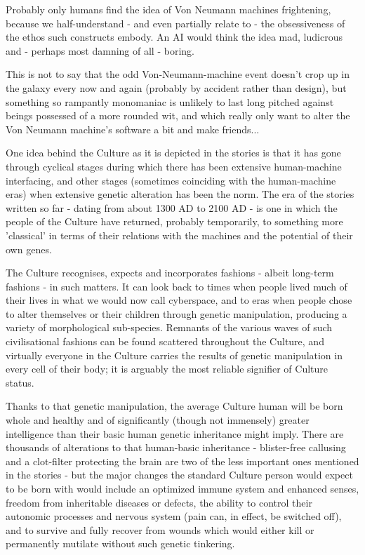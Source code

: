 Probably only humans find the idea of Von Neumann machines frightening, because we half-understand - and even partially relate to - the obsessiveness of the ethos such constructs embody. An AI would think the idea mad, ludicrous and - perhaps most damning of all - boring.

This is not to say that the odd Von-Neumann-machine event doesn't crop up in the galaxy every now and again (probably by accident rather than design), but something so rampantly monomaniac is unlikely to last long pitched against beings possessed of a more rounded wit, and which really only want to alter the Von Neumann machine's software a bit and make friends...

One idea behind the Culture as it is depicted in the stories is that it has gone through cyclical stages during which there has been extensive human-machine interfacing, and other stages (sometimes coinciding with the human-machine eras) when extensive genetic alteration has been the norm. The era of the stories written so far - dating from about 1300 AD to 2100 AD - is one in which the people of the Culture have returned, probably temporarily, to something more 'classical' in terms of their relations with the machines and the potential of their own genes.

The Culture recognises, expects and incorporates fashions - albeit long-term fashions - in such matters. It can look back to times when people lived much of their lives in what we would now call cyberspace, and to eras when people chose to alter themselves or their children through genetic manipulation, producing a variety of morphological sub-species. Remnants of the various waves of such civilisational fashions can be found scattered throughout the Culture, and virtually everyone in the Culture carries the results of genetic manipulation in every cell of their body; it is arguably the most reliable signifier of Culture status.

Thanks to that genetic manipulation, the average Culture human will be born whole and healthy and of significantly (though not immensely) greater intelligence than their basic human genetic inheritance might imply. There are thousands of alterations to that human-basic inheritance - blister-free callusing and a clot-filter protecting the brain are two of the less important ones mentioned in the stories - but the major changes the standard Culture person would expect to be born with would include an optimized immune system and enhanced senses, freedom from inheritable diseases or defects, the ability to control their autonomic processes and nervous system (pain can, in effect, be switched off), and to survive and fully recover from wounds which would either kill or permanently mutilate without such genetic tinkering.


